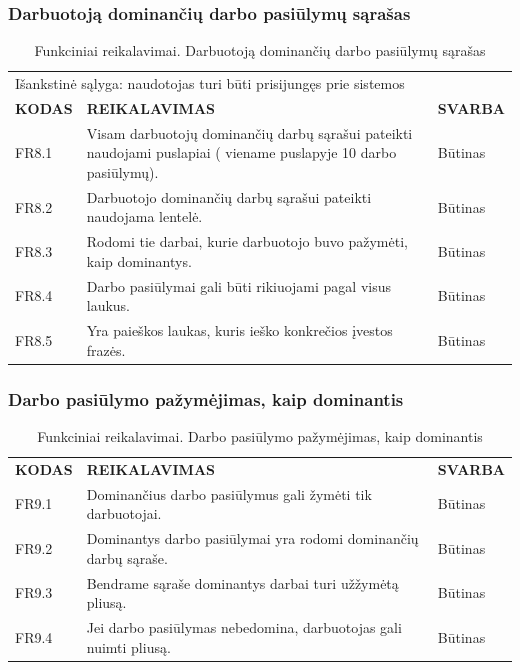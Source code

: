 \documentclass{VUMIFPSkursinis}
\begin{document}
\subsubsection{Darbuotoją dominančių darbo pasiūlymų sąrašas}
\begin{table}[H]
\caption{Funkciniai reikalavimai. Darbuotoją dominančių darbo pasiūlymų sąrašas}
\centering
\normalsize
\begin{tabular}{|p{2cm}|p{10cm}|p{3cm}|}
\hline
\rowcolor{gray!30}
\multicolumn{3}{|l|}{\textbf{8. Darbuotoją dominančių darbo pasiūlymų sąrašas}} \\ \hline
\multicolumn{3}{|l|}{Išankstinė sąlyga: naudotojas turi būti prisijungęs prie sistemos}\\ \hline
\textbf{KODAS}& \multicolumn{1}{m{10cm}|}{\textbf{REIKALAVIMAS}} & \textbf{SVARBA} \\ \hline
FR8.1 & \multicolumn{1}{m{10cm}|}{Visam darbuotojų dominančių darbų sąrašui pateikti naudojami puslapiai ( viename puslapyje 10 darbo pasiūlymų).} & Būtinas \\ \hline
FR8.2 & \multicolumn{1}{m{10cm}|}{Darbuotojo dominančių darbų sąrašui pateikti naudojama lentelė.} & Būtinas \\ \hline
FR8.3 & \multicolumn{1}{m{10cm}|}{Rodomi tie darbai, kurie darbuotojo buvo pažymėti, kaip dominantys.} & Būtinas \\ \hline
FR8.4 & \multicolumn{1}{m{10cm}|}{Darbo pasiūlymai gali būti rikiuojami pagal visus laukus.} & Būtinas \\ \hline
FR8.5 & \multicolumn{1}{m{10cm}|}{Yra paieškos laukas, kuris ieško konkrečios įvestos frazės.} & Būtinas \\ \hline
\end{tabular}
\end{table}

\subsubsection{Darbo pasiūlymo pažymėjimas, kaip dominantis}
\begin{table}[H]
\caption{Funkciniai reikalavimai. Darbo pasiūlymo pažymėjimas, kaip dominantis}
\centering
\normalsize
\begin{tabular}{|p{2cm}|p{10cm}|p{3cm}|}
\hline
\rowcolor{gray!30}
\multicolumn{3}{|l|}{\textbf{9. Darbo pasiūlymo pažymėjimas, kaip dominantis}} \\ \hline
\textbf{KODAS}& \multicolumn{1}{m{10cm}|}{\textbf{REIKALAVIMAS}} & \textbf{SVARBA} \\ \hline
FR9.1 & \multicolumn{1}{m{10cm}|}{Dominančius darbo pasiūlymus gali žymėti tik darbuotojai.} & Būtinas \\ \hline
FR9.2 & \multicolumn{1}{m{10cm}|}{Dominantys darbo pasiūlymai yra rodomi dominančių darbų sąraše.} & Būtinas \\ \hline
FR9.3 & \multicolumn{1}{m{10cm}|}{Bendrame sąraše dominantys darbai turi užžymėtą pliusą.} & Būtinas \\ \hline
FR9.4 & \multicolumn{1}{m{10cm}|}{Jei darbo pasiūlymas nebedomina, darbuotojas gali nuimti pliusą.} & Būtinas \\ \hline
\end{tabular}
\end{table}
\end{document}
